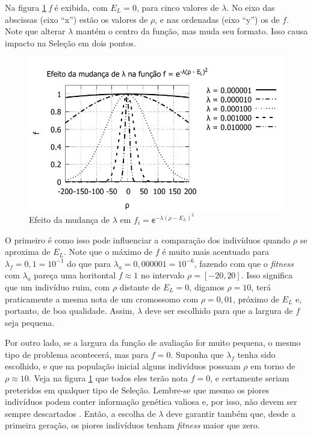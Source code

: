 	Na figura \ref{fig:f_efeito_lambda} \emph{f} é exibida, com $E_L = 0$, para cinco valores de $\lambda$. No eixo das abscissas (eixo ``x'') estão os valores de $\rho$, e nas ordenadas (eixo ``y'') os de $f$. Note que alterar $\lambda$ mantém o centro da função, mas muda seu formato. Isso causa impacto na Seleção em dois pontos.
	
	\begin{figure}[h]
		\centering
			\includegraphics[width=1.0\textwidth]{figs/resultados/precisaoFitness/f_varios_lambdas.pdf}
		\caption{Efeito da mudança de $\lambda$ em $f_i = \mathsf{e}^{-\lambda(\rho - E_L)^2}$}
		\label{fig:f_efeito_lambda}
	\end{figure}
	
	 O primeiro é como isso pode influenciar a comparação dos indivíduos quando $\rho$ se aproxima de $E_L$. Note que o máximo de $f$ é muito mais acentuado para $\lambda_f = 0,1 = 10^{-1}$ do que para $\lambda_a = 0,000001 = 10^{-6}$, fazendo com que o \emph{fitness} com $\lambda_a$ pareça uma horitontal $f \approx 1$ no intervalo $\rho = [-20,20]$. Isso significa que um indivíduo ruim, com $\rho$ distante de $E_L = 0$, digamos $\rho = 10$, terá praticamente a mesma nota de um cromossomo com $\rho = 0,01$, próximo de $E_L$ e, portanto, de boa qualidade. Assim, $\lambda$ deve ser escolhido para que a largura de $f$ seja pequena.
	
	Por outro lado, se a largura da função de avaliação for muito pequena, o mesmo tipo de problema acontecerá, mas para $f = 0$. Suponha que $\lambda_f$ tenha sido escolhido, e que na população inicial alguns indivíduos possuam $\rho$ em torno de $\rho \approx 10$. Veja na figura \ref{fig:f_efeito_lambda} que todos eles terão nota $f = 0$, e certamente seriam preteridos em qualquer tipo de Seleção. Lembre-se que mesmo os piores indivíduos podem conter informação genética valiosa e, por isso, não devem ser sempre descartados \cite{Mitchell98}. Então, a escolha de $\lambda$ deve garantir também que, desde a primeira geração, os piores indivíduos tenham \emph{fitness} maior que zero.

